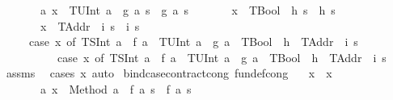 \begin{isabellebody}
\ \ \ \ \ \ \ {\isachardoublequoteopen}{\isasymAnd}a{\isachardot}{\kern0pt}\ x\ {\isacharequal}{\kern0pt}\ {\isacharparenleft}{\kern0pt}TUInt\ a{\isacharparenright}{\kern0pt}\ {\isasymLongrightarrow}\ g\ a\ s\ {\isacharequal}{\kern0pt}\ g{\isacharprime}{\kern0pt}\ a\ s{\isachardoublequoteclose}\isanewline
\ \ \ \ \ \ \ {\isachardoublequoteopen}x\ {\isacharequal}{\kern0pt}\ TBool\ {\isasymLongrightarrow}\ h\ s\ {\isacharequal}{\kern0pt}\ h{\isacharprime}{\kern0pt}\ s{\isachardoublequoteclose}\isanewline
\ \ \ \ \ \ \ {\isachardoublequoteopen}x\ {\isacharequal}{\kern0pt}\ TAddr\ {\isasymLongrightarrow}\ i\ s\ {\isacharequal}{\kern0pt}\ i{\isacharprime}{\kern0pt}\ s{\isachardoublequoteclose}\isanewline
\ \ \ \ \ {\isachardoublequoteopen}{\isacharparenleft}{\kern0pt}case\ x\ of\ {\isacharparenleft}{\kern0pt}TSInt\ a{\isacharparenright}{\kern0pt}\ {\isasymRightarrow}\ f\ a\ {\isacharbar}{\kern0pt}\ {\isacharparenleft}{\kern0pt}TUInt\ a{\isacharparenright}{\kern0pt}\ {\isasymRightarrow}\ g\ a\ {\isacharbar}{\kern0pt}\ TBool\ {\isasymRightarrow}\ h\ {\isacharbar}{\kern0pt}\ TAddr\ {\isasymRightarrow}\ i{\isacharparenright}{\kern0pt}\ s\isanewline
\ \ \ \ \ \ \ \ \ {\isacharequal}{\kern0pt}\ {\isacharparenleft}{\kern0pt}case\ x{\isacharprime}{\kern0pt}\ of\ {\isacharparenleft}{\kern0pt}TSInt\ a{\isacharparenright}{\kern0pt}\ {\isasymRightarrow}\ f{\isacharprime}{\kern0pt}\ a\ {\isacharbar}{\kern0pt}\ {\isacharparenleft}{\kern0pt}TUInt\ a{\isacharparenright}{\kern0pt}\ {\isasymRightarrow}\ g{\isacharprime}{\kern0pt}\ a\ {\isacharbar}{\kern0pt}\ TBool\ {\isasymRightarrow}\ h{\isacharprime}{\kern0pt}\ {\isacharbar}{\kern0pt}\ TAddr\ {\isasymRightarrow}\ i{\isacharprime}{\kern0pt}{\isacharparenright}{\kern0pt}\ s{\isachardoublequoteclose}\isanewline
%
\isadelimproof
\ \ %
\endisadelimproof
%
\isatagproof
{}\isamarkupfalse%
\ assms\ \isamarkupfalse%
\ {\isacharparenleft}{\kern0pt}cases\ x{\isacharcomma}{\kern0pt}\ auto{\isacharparenright}{\kern0pt}%
\endisatagproof
{\isafoldproof}%
%
\isadelimproof
\isanewline
%
\endisadelimproof
\isanewline
{}\isamarkupfalse%
\ bind{\isacharunderscore}{\kern0pt}case{\isacharunderscore}{\kern0pt}contract{\isacharunderscore}{\kern0pt}cong\ {\isacharbrackleft}{\kern0pt}fundef{\isacharunderscore}{\kern0pt}cong{\isacharbrackright}{\kern0pt}{\isacharcolon}{\kern0pt}\isanewline
\ \ \ {\isachardoublequoteopen}x\ {\isacharequal}{\kern0pt}\ x{\isacharprime}{\kern0pt}{\isachardoublequoteclose}\isanewline
\ \ \ \ \ \ \ {\isachardoublequoteopen}{\isasymAnd}a{\isachardot}{\kern0pt}\ x\ {\isacharequal}{\kern0pt}\ Method\ a\ {\isasymLongrightarrow}\ f\ a\ s\ {\isacharequal}{\kern0pt}\ f{\isacharprime}{\kern0pt}\ a\ s{\isachardoublequoteclose}\isanewline

\end{isabellebody}
